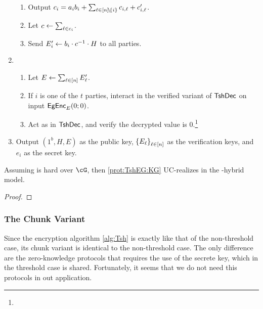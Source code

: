 \begin{protocol}
\begin{enumerate}
\begin{enumerate}
			\item Output $c_i = a_i b_i  + \sum_{\ell \in  [n]\!\setminus\!\{i\}} c_{i,\ell} + c_{i,\ell}'$.
			
			\item Let $c \leftarrow \sum_{\ell \in c_i}$.
			 
			
			
			
			
			
			\item Send $E'_i \leftarrow b_i \cdot c^{-1} \cdot H$ to all parties.
			
			
		\end{enumerate}
		
		\item {}
		
		\begin{enumerate}
			\item 	Let $E \leftarrow \sum_{\ell \in [n]} E'_\ell$.
			
			\item If $i$ is one  of the  $t$ parties, interact in the verified variant of  $\mathsf{TshDec}$ on input $\mathsf{EgEnc}_E(0;0)$.
			
			\item Act as \Cc in $\mathsf{TshDec}$,  and verify the  decrypted value is $0$.\footnote{}
		\end{enumerate}
	
		
		\item Output $(1^b,H,E)$ as the public key, $\set{E_\ell}_{\ell \in [n]}$ as the verification keys, and $e_i$ as the secret key.
			
		\end{enumerate}
	
	
\end{protocol}


\begin{theorem}\label{thm:TshEG:KG}
	Assuming \DDH is hard over $\cG$, then \cref{prot:TshEG:KG} UC-realizes \tdKg in the \sset{\randomH,{\Mult}}-hybrid model.
\end{theorem}
\begin{proof}
\end{proof}


\subsubsection{The Chunk Variant}\label{sec:ChanksEg:TshEG:Chunk}	
Since the encryption algorithm  \cref{alg:Tsh} is exactly like that of the non-threshold case, its chunk variant is identical to the non-threshold case. The only difference are the zero-knowledge protocols  that requires the use of the secrete key, which in the threshold case is shared. Fortunately, it seems that  we do not need this protocols in out application.

